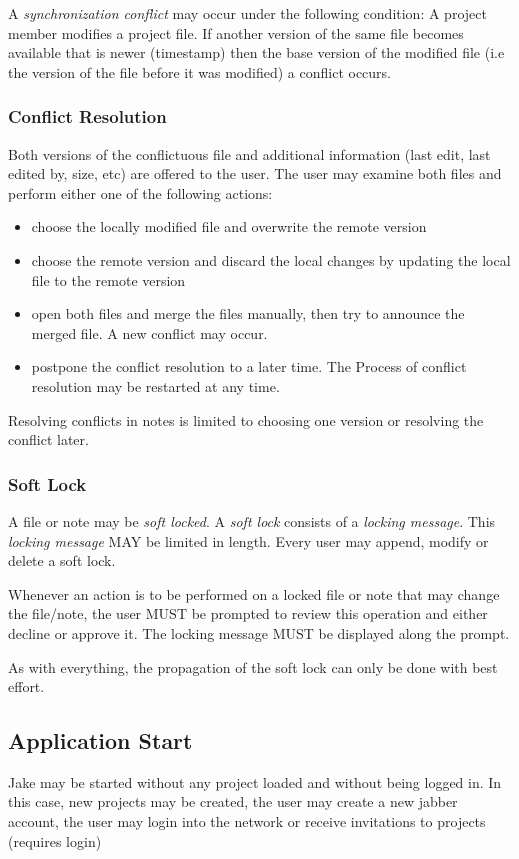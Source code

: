 A \emph{synchronization conflict} may occur under the following condition: A project member modifies a project file. If another version of the same file becomes available that is newer (timestamp) then the base version of the modified file (i.e the version of the file before it was modified) a conflict occurs.

\subsubsection{Conflict Resolution}
Both versions of the conflictuous file and additional information (last edit, last edited by, size, etc) are offered to the user. The user may examine both files and perform either one of the following actions:
\begin{itemize}
\item choose the locally modified file and overwrite the remote version
\item choose the remote version and discard the local changes by updating the local file to the remote version
\item open both files and merge the files manually, then try to announce the merged file. A new conflict may occur.
\item postpone the conflict resolution to a later time. The Process of conflict resolution may be restarted at any time.
\end{itemize}

Resolving conflicts in notes is limited to choosing one version or resolving the conflict later.

\subsubsection{Soft Lock}
A file or note may be \emph{soft locked}. A \emph{soft lock} consists of a \emph{locking message}. This \emph{locking message} MAY be limited in length. Every user may append, modify or delete a soft lock. 

Whenever an action is to be performed on a locked file or note that may change the file/note, the user MUST be prompted to review this operation and either decline or approve it. The locking message MUST be displayed along the prompt.

As with everything, the propagation of the soft lock can only be done with best effort.

\subsection{Application Start}
Jake may be started without any project loaded and without being logged in. In this case, new projects may be created, the user may create a new jabber account, the user may login into the network or receive invitations to projects (requires login)

